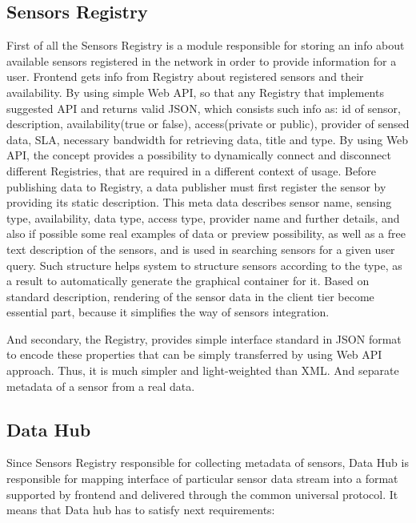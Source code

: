   \subsection{Sensors Registry}
    First of all the Sensors Registry is a module responsible for storing an info about available sensors registered in the network in order to provide information for a user. Frontend gets info from Registry about registered sensors and their availability. By using simple Web API, so that any Registry that implements suggested API and returns valid JSON, which consists such info as: id of sensor, description, availability(true or false), access(private or public), provider of sensed data, SLA, necessary bandwidth for retrieving data, title and type. By using Web API, the concept provides a possibility to dynamically connect and disconnect different Registries, that are required in a different context of usage. 
    \newline
    Before publishing data to Registry, a data publisher must first register the sensor by providing its static description. This meta data describes sensor name, sensing type, availability, data type, access type, provider name and further details, and also if possible some real examples of data or preview possibility, as well as a free text description of the sensors, and is used in searching sensors for a given user query.
    \newline
    Such structure helps system to structure sensors according to the type, as a result to automatically generate the graphical container for it. Based on standard description, rendering of the sensor data in the client tier become essential part, because it simplifies the way of sensors integration. 

    And secondary, the Registry, provides simple interface standard in JSON format to encode these properties that can be simply transferred by using Web API approach. Thus, it is much simpler and light-weighted than XML. And separate metadata of a sensor from a real data. 

  \subsection{Data Hub}
    Since Sensors Registry responsible for collecting metadata of sensors, Data Hub is responsible for mapping interface of particular sensor data stream into a format supported by frontend and delivered through the common universal protocol. It means that Data hub has to satisfy next requirements:

